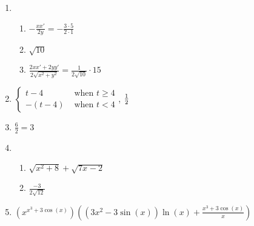 \documentclass[12pt,twoside]{article}
\makeatletter
\def\emptycleardoublepage{\clearpage\if@twoside \ifodd\c@page\else
\thispagestyle{empty}%
\hbox{}\newpage\if@twocolumn\hbox{}\newpage\fi\fi\fi}
\makeatother
\begin{document}
\begin{multicols}{2}
\begin{enumerate}
\def \b{2}\def \x{3}\def \y{1}\def \xchange{5}\def \ratrhs{3}\def \cirrhs{11}\def \hyprhs{7}\def \compy{2y^{2}}\def \ychangenum{5}\def \dist{10}\def \fracrat{\frac{80}{3}}\def \fraccirc{15}\def \frachyp{45}
\item \begin{enumerate}
\item $-\frac{xx'}{\b y} = -\frac{\x \cdot \xchange}{\b \cdot \y}$
\item $\sqrt{\dist}$
\item $\frac{2xx'+2yy'}{2\sqrt{x^2+y^2}} = \frac{1}{2\sqrt{\dist}} \cdot \fraccirc$
\end{enumerate}
\def \a{4}\def \k{2}\def \abstop{1}\def \ktop{0}
\item $\begin{cases} t-\a & \text{ when } t \geq \a \\ -(t- \a) & \text{ when } t < \a \end{cases}$, $\ifthenelse{\ktop=1}{\k}{\frac{1}{\k}}$
\def \a{2}\def \b{0}\def \k{6}\def \fancyp{x^{2}-2x^{}}\def \simplep{6x^{}-12}\def \fancyreduced{2}\def \niceanstop{\frac{1}{3}}\def \niceansbottom{3}
\item $\frac{\k}{\fancyreduced} = \niceansbottom$
\def \a{2}\def \b{5}\def \ab{10}\def \c{8}\def \amb{-3}\def \ansroot{12}\def \firstroot{x^{2}+8}\def \secondroot{7x^{}-2}\def \porm{1}
\item \begin{enumerate}
\item $\sqrt{\firstroot} + \sqrt{\secondroot}$
\item $\frac{\amb}{2\sqrt{\ansroot}}$
\end{enumerate}
\def \varexp{3}\def \newexp{2}\def \trigcoeff{3}\def \trigval{+3}\def \oppval{-3}
\item $(x^{x^\varexp \trigval \cos(x)}) \left( (\varexp x^{\newexp} \oppval \sin(x))\ln(x) + \frac{x^\varexp \trigval \cos(x)}{x} \right)$
 \end{enumerate}\end{multicols}\emptycleardoublepage{}\graphicspath{{C:/Users/iainc/anaconda3/Randomizer/MATH 1001/Midterm 1/}}\begin{multicols}{2} \begin{enumerate}\def \a{4}\def \b{5}\def \c{-3}\def \d{4}\def \negb{-5}\def \negc{3}\def \determ{31}\def \ansa{\frac{4}{31}}\def \ansb{\frac{-5}{31}}\def \ansc{\frac{3}{31}}\def \ansd{\frac{4}{31}}

\end{enumerate}
\end{multicols}
\end{document}

